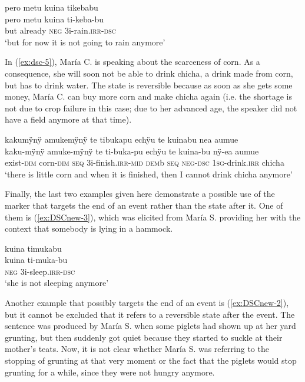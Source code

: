 \ea\label{ex:DSCnew-5}
\begingl
\glpreamble pero metu kuina tikebabu\\
\gla pero metu kuina ti-keba-bu\\
\glb but already \textsc{neg} 3i-rain.\textsc{irr}-\textsc{dsc}\\
\glft ‘but for now it is not going to rain anymore’
\endgl
\trailingcitation{[jxx-e120516l-1.101]}
\xe


In (\ref{ex:dsc-5}), María C. is speaking about the scarceness of corn. As a consequence, she will soon not be able to drink chicha, a drink made from corn, but has to drink water. The state is reversible because as soon as she gets some money, María C. can buy more corn and make chicha again (i.e. the shortage is not due to crop failure in this case; due to her advanced age, the speaker did not have a field anymore at that time).

\ea\label{ex:dsc-5}
\begingl
\glpreamble kakumÿnÿ amukemÿnÿ te tibukapu echÿu te kuinabu nea aumue\\
\gla kaku-mÿnÿ amuke-mÿnÿ te ti-buka-pu echÿu te kuina-bu nÿ-ea aumue\\
\glb exist-\textsc{dim} corn-\textsc{dim} \textsc{seq} 3i-finish.\textsc{irr}-\textsc{mid} \textsc{dem}b \textsc{seq} \textsc{neg}-\textsc{dsc} 1\textsc{sg}-drink.\textsc{irr} chicha\\
\glft ‘there is little corn and when it is finished, then I cannot drink chicha anymore’
\endgl
\trailingcitation{[ump-p110815sf.693]}
\xe

Finally, the last two examples given here demonstrate a possible use of the marker that targets the end of an event rather than the state after it. One of them is (\ref{ex:DSCnew-3}), which was elicited from María S. providing her with the context that somebody is lying in a hammock.

\ea\label{ex:DSCnew-3}
\begingl
\glpreamble kuina timukabu\\
\gla kuina ti-muka-bu\\
\glb \textsc{neg} 3i-sleep.\textsc{irr}-\textsc{dsc}\\
\glft ‘she is not sleeping anymore’
\endgl
\trailingcitation{[rxx-e181024l]}
\xe

Another example that possibly targets the end of an event is (\ref{ex:DSCnew-2}), but it cannot be excluded that it refers to a reversible state after the event. The sentence was produced by María S. when some piglets had shown up at her yard grunting, but then suddenly got quiet because they started to suckle at their mother’s teats. Now, it is not clear whether María S. was referring to the stopping of grunting at that very moment or the fact that the piglets would stop grunting for a while, since they were not hungry anymore.

